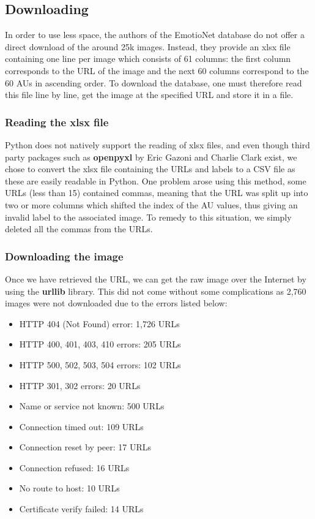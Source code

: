 \documentclass[12pt,twoside]{article}
\begin{document}
\subsection{Downloading}

In order to use less space, the authors of the EmotioNet database do not offer
a direct download of the  around 25k images. Instead, they provide an xlsx file containing one line per image which consists of 61 columns: the first column corresponds to the URL of the image and the next 60 columns correspond to the 60 AUs in ascending order. To download the database, one must therefore read this file line by line, get the image at the specified URL and store it in a file. 

\subsubsection{Reading the xlsx file}

Python does not natively support the reading of xlsx files, and even though third party packages such as \textbf{openpyxl} by Eric Gazoni and Charlie Clark exist, we chose to convert the xlsx file containing the URLs and labels to a CSV file as these are easily readable in Python. One problem arose using this method, some URLs (less than 15) contained commas, meaning that the URL was split up into two or more columns which shifted the index of the AU values, thus giving an invalid label to the associated image. To remedy to this situation, we simply deleted all the commas from the URLs.

\subsubsection{Downloading the image}

Once we have retrieved the URL, we can get the raw image over the Internet by using the \textbf{urllib} library. This did not come without some complications as 2,760 images were not downloaded due to the errors listed below:

\begin{itemize}
\item HTTP 404 (Not Found) error: 1,726 URLs
\item HTTP 400, 401, 403, 410 errors: 205 URLs
\item HTTP 500, 502, 503, 504 errors: 102 URLs
\item HTTP 301, 302 errors: 20 URLs
\item Name or service not known: 500 URLs
\item Connection timed out: 109 URLs
\item Connection reset by peer: 17 URLs
\item Connection refused: 16 URLs
\item No route to host: 10 URLs
\item Certificate verify failed: 14 URLs
\end{itemize}
\end{document}
